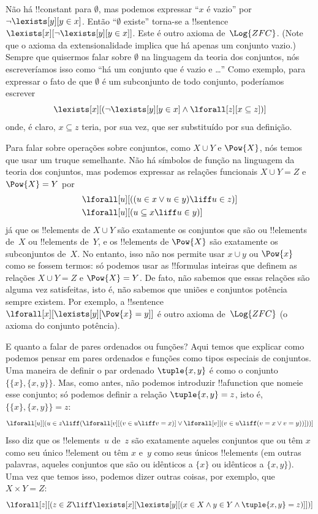 \documentclass[../../../include/open-logic-section]{subfiles}
\begin{document}
Não há !!{constant} para $\emptyset$, mas podemos expressar ``$x$ é
vazio'' por $\lnot \lexists[y][y \in x]$.  Então ``$\emptyset$ existe''
torna-se a !!{sentence}~$\lexists[x][\lnot \lexists[y][y \in
    x]]$. Este é outro axioma de~$\Log{ZFC}$.  (Note que o axioma
da extensionalidade implica que há apenas um conjunto vazio.)  Sempre que
quisermos falar sobre $\emptyset$ na linguagem da teoria dos conjuntos, nós
escreveríamos isso como ``há um conjunto que é vazio e \dots'' Como
exemplo, para expressar o fato de que $\emptyset$ é um subconjunto de todo
conjunto, poderíamos escrever
\[
\lexists[x][(\lnot\lexists[y][y \in x] \land \lforall[z][x \subseteq
    z])]
\]
onde, é claro, $x \subseteq z$ teria, por sua vez, que ser substituído por
sua definição.

Para falar sobre operações sobre conjuntos, como $X \cup Y$ e $\Pow{X}$, nós
temos que usar um truque semelhante.  Não há símbolos de função na
linguagem da teoria dos conjuntos, mas podemos expressar as relações funcionais $X
\cup Y = Z$ e $\Pow{X} = Y$ por
\begin{align*}
& \lforall[u][((u \in x \lor u \in y) \liff u \in z)]\\
& \lforall[u][(u \subseteq x \liff u \in y )]
\end{align*}
já que os !!{element}s de $X \cup Y$ são exatamente os conjuntos que são
ou !!{element}s de~$X$ ou !!{element}s de~$Y$, e os
!!{element}s de $\Pow{X}$ são exatamente os subconjuntos de~$X$.  No entanto,
isso não nos permite usar $x \cup y$ ou $\Pow{x}$ como se fossem
termos: só podemos usar as !!{formula}s inteiras que definem as
relações $X \cup Y = Z$ e $\Pow{X} = Y$. De fato, não sabemos
que essas relações são alguma vez satisfeitas, isto é, não sabemos que
uniões e conjuntos potência sempre existem. Por exemplo, a !!{sentence}
$\lforall[x][\lexists[y][\Pow{x} = y]]$ é outro axioma
de~$\Log{ZFC}$ (o axioma do conjunto potência).

E quanto a falar de pares ordenados ou funções?  Aqui temos que
explicar como podemos pensar em pares ordenados e funções como tipos especiais
de conjuntos.  Uma maneira de definir o par ordenado $\tuple{x, y}$ é
como o conjunto $\{\{x\}, \{x, y\}\}$.  Mas, como antes, não podemos
introduzir !!a{function} que nomeie esse conjunto; só podemos definir a
relação $\tuple{x, y} = z$, isto é, $\{\{x\}, \{x, y\}\} = z$:
\[
\lforall[u][(u \in z \liff (\lforall[v][(v \in u \liff v = x)] \lor
  \lforall[v][(v \in u \liff (v = x \lor v = y))]))]
\]
Isso diz que os !!{element}s~$u$ de~$z$ são exatamente aqueles conjuntos que
ou têm $x$ como seu único !!{element} ou têm $x$ e~$y$ como seus
únicos !!{element}s (em outras palavras, aqueles conjuntos que são ou idênticos
a $\{x\}$ ou idênticos a $\{x, y\}$).  Uma vez que temos isso, podemos dizer
outras coisas, por exemplo, que $X \times Y = Z$:
\[
\lforall[z][(z \in Z \liff \lexists[x][\lexists[y][(x \in
        X \land y \in Y \land \tuple{x, y} = z)]])]
\]
\end{document}
